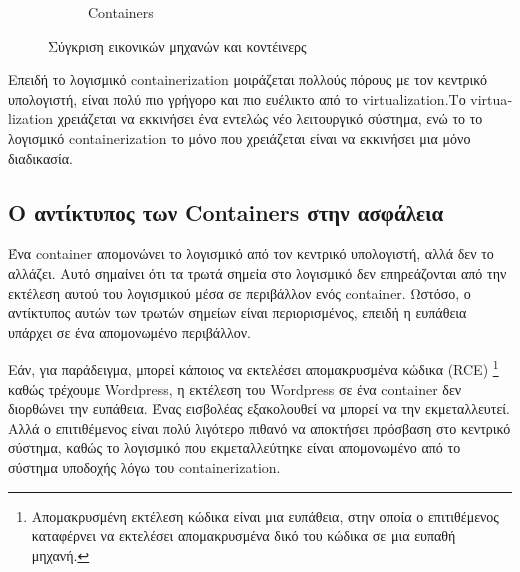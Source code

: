 \begin{figure}[ht]
\begin{subfigure}[t]{.45\textwidth}
        \caption{\textlatin{Containers}}
    \end{subfigure}
    \caption{Σύγκριση εικονικών μηχανών και κοντέινερς}
\end{figure}


Επειδή το λογισμικό \textlatin{containerization} μοιράζεται πολλούς πόρους με
τον κεντρικό υπολογιστή,
είναι πολύ πιο γρήγορο και πιο ευέλικτο από το \textlatin{virtualization}.Tο
\textlatin{virtualization} χρειάζεται να εκκινήσει ένα εντελώς νέο λειτουργικό
σύστημα, ενώ το το λογισμικό \textlatin{containerization} το μόνο που
χρειάζεται είναι να εκκινήσει μια μόνο διαδικασία.

\subsection{Ο αντίκτυπος των \textlatin{Containers} στην ασφάλεια}

Ένα \textlatin{container} απομονώνει το λογισμικό από τον κεντρικό υπολογιστή,
αλλά δεν το αλλάζει. Αυτό σημαίνει ότι τα τρωτά σημεία στο λογισμικό δεν
επηρεάζονται από την εκτέλεση αυτού του λογισμικού μέσα σε περιβάλλον ενός
\textlatin{container}.
Ωστόσο, ο αντίκτυπος αυτών των τρωτών σημείων είναι περιορισμένος, επειδή η
ευπάθεια υπάρχει σε ένα απομονωμένο περιβάλλον.

Εάν, για παράδειγμα, μπορεί κάποιος να εκτελέσει απομακρυσμένα  κώδικα
(\textlatin{RCE})
\footnote{Απομακρυσμένη εκτέλεση κώδικα είναι μια ευπάθεια, στην οποία ο
επιτιθέμενος καταφέρνει να εκτελέσει απομακρυσμένα δικό του κώδικα σε μια
ευπαθή μηχανή.} καθώς τρέχουμε \textlatin{Wordpress}, η εκτέλεση του
\textlatin{Wordpress} σε ένα \textlatin{container} δεν διορθώνει την ευπάθεια.
Ένας εισβολέας εξακολουθεί να μπορεί να την εκμεταλλευτεί. Αλλά ο επιτιθέμενος
είναι πολύ λιγότερο πιθανό να αποκτήσει πρόσβαση στο κεντρικό σύστημα, καθώς το
λογισμικό που εκμεταλλεύτηκε είναι απομονωμένο από το σύστημα υποδοχής λόγω του
\textlatin{containerization}.

